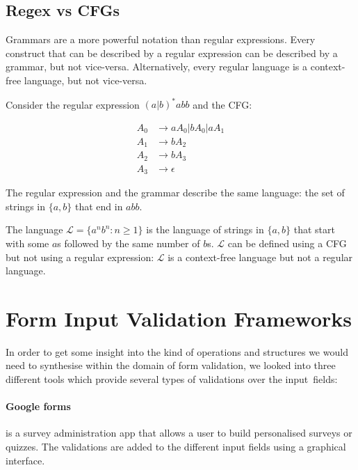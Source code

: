 \subsection{Regex vs \acp{CFG}} \label{sec:regex-vs-CFG}

Grammars are a more powerful notation than regular expressions. Every construct that can be described by a regular expression can be described by a grammar, but not vice-versa. Alternatively, every regular language is a context-free language, but not vice-versa.

\begin{example}
Consider the regular expression \((a|b)^*abb\) and the \ac{CFG}:

\begin{equation}
\begin{aligned} %
A_0 &\to aA_0 | bA_0 | aA_1\\
A_1 &\to bA_2\\
A_2 &\to bA_3\\
A_3 &\to \epsilon
\end{aligned}
\end{equation}

The regular expression and the grammar describe the same language: the set of strings in \(\{a, b\}\) that end in \(abb\).

\end{example}

\begin{example}
The language \(\mathcal{L} = \{a^n b^n : n \ge 1\}\) is the language of strings in \(\{a, b\}\) that start with some \(a\)s followed by the same number of \(b\)s.  \(\mathcal{L}\) can be defined using a \ac{CFG} but not using a regular expression:  \(\mathcal{L}\) is a context-free language but not a regular language.
\end{example}






\section{Form Input Validation Frameworks} \label{sec:form-validation}

In order to get some insight into the kind of operations and structures we would need to synthesise within the domain of form validation, we looked into three different tools which provide several types of validations over the input~fields:

\paragraph{Google forms\protect\footnotemark} is a survey administration app that allows a user to build personalised surveys or quizzes. The validations are added to the different input fields using a graphical interface. 

